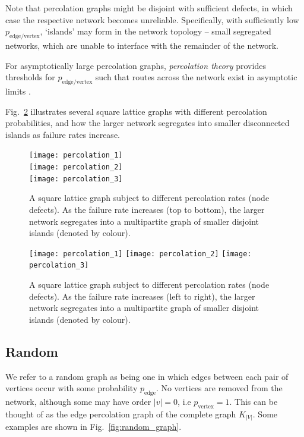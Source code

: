 Note that percolation graphs might be disjoint with sufficient defects, in which case the respective network becomes unreliable. Specifically, with sufficiently low $p_\mathrm{edge/vertex}$, `islands' may form in the network topology -- small segregated networks, which are unable to interface with the remainder of the network.

For asymptotically large percolation graphs, \textit{percolation theory} \cite{???} provides thresholds for $p_\mathrm{edge/vertex}$ such that routes across the network exist in asymptotic limits \cite{???}.

Fig.~\ref{fig:perc_graph} illustrates several square lattice graphs with different percolation probabilities, and how the larger network segregates into smaller disconnected islands as failure rates increase.

\pubmode
	\begin{figure}[!htbp]
	\texttt{[image: percolation\_1]}\\
	\texttt{[image: percolation\_2]}\\
	\texttt{[image: percolation\_3]}
	\caption{A square lattice graph subject to different percolation rates (node defects). As the failure rate increases (top to bottom), the larger network segregates into a multipartite graph of smaller disjoint islands (denoted by colour).} \label{fig:perc_graph}
	\end{figure}
\else
	\begin{figure}[!htbp]
	\texttt{[image: percolation\_1]}
	\texttt{[image: percolation\_2]}
	\texttt{[image: percolation\_3]}
	\caption{A square lattice graph subject to different percolation rates (node defects). As the failure rate increases (left to right), the larger network segregates into a multipartite graph of smaller disjoint islands (denoted by colour).} \label{fig:perc_graph}
	\end{figure}
\fi

%
%

\subsection{Random}

We refer to a random graph as being one in which edges between each pair of vertices occur with some probability $p_\mathrm{edge}$. No vertices are removed from the network, although some may have order \mbox{$|v|=0$}, i.e \mbox{$p_\mathrm{vertex}=1$}. This can be thought of as the edge percolation graph of the complete graph $K_{|V|}$. Some examples are shown in Fig.~\ref{fig:random_graph}.

